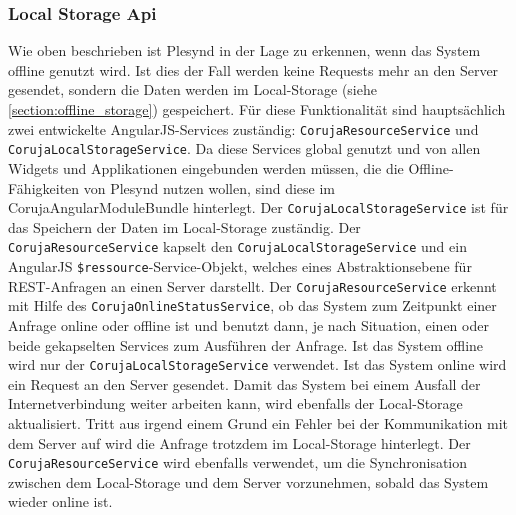 \subsubsection*{Local Storage Api}
Wie oben beschrieben ist Plesynd in der Lage zu erkennen, wenn das System offline genutzt wird. Ist dies der Fall werden keine Requests mehr an den Server gesendet, sondern die Daten werden im Local-Storage (siehe \ref{section:offline_storage}) gespeichert. Für diese Funktionalität sind hauptsächlich zwei entwickelte AngularJS-Services zuständig: \texttt{CorujaResourceService} und \texttt{Coruja\allowbreak Local\allowbreak Storage\allowbreak Service}. Da diese Services global genutzt und von allen Widgets und Applikationen eingebunden werden müssen, die die Offline-Fähigkeiten von Plesynd nutzen wollen, sind diese im CorujaAngularModuleBundle hinterlegt. Der \texttt{Coruja\allowbreak Local\allowbreak Storage\allowbreak Service} ist für das Speichern der Daten im Local-Storage zuständig. Der \texttt{Coruja\allowbreak Resource\allowbreak Service} kapselt den \texttt{Coruja\allowbreak Local\allowbreak Storage\allowbreak Service} und ein AngularJS \texttt{\$ressource}-Service-Objekt, welches eines Abstraktionsebene für REST-Anfragen an einen Server darstellt. Der \texttt{Coruja\allowbreak Resource\allowbreak Service} erkennt mit Hilfe des \texttt{Coruja\allowbreak Online\allowbreak Status\allowbreak Service}, ob das System zum Zeitpunkt einer Anfrage online oder offline ist und benutzt dann, je nach Situation, einen oder beide gekapselten Services zum Ausführen der Anfrage. Ist das System offline wird nur der \texttt{Coruja\allowbreak Local\allowbreak Storage\allowbreak Service} verwendet. Ist das System online wird ein Request an den Server gesendet. Damit das System bei einem Ausfall der Internetverbindung weiter arbeiten kann, wird ebenfalls der Local-Storage aktualisiert. Tritt aus irgend einem Grund ein Fehler bei der Kommunikation mit dem Server auf wird die Anfrage trotzdem im Local-Storage hinterlegt. Der \texttt{Coruja\allowbreak Resource\allowbreak Service} wird ebenfalls verwendet, um die Synchronisation zwischen dem Local-Storage und dem Server vorzunehmen, sobald das System wieder online ist. 

